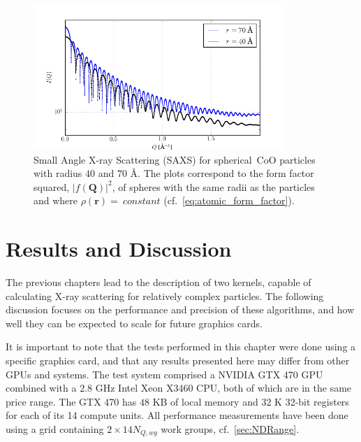 \documentclass[11pt,twoside]{report}
\newcommand{\chem}[1]{\ensuremath{\mathrm{#1}}}
\begin{document}
\begin{figure}[htbp]
	\begin{center}
		\includegraphics[width=0.85\textwidth]{img/diffractogram_random2.png}	
	\end{center}
	\caption{Small Angle X-ray Scattering (SAXS) for spherical~\chem{CoO} particles with radius $40$ and $70$ \AA. The plots correspond to the form factor squared, $|f({\mathbf Q})|^{2}$, of spheres  with the same radii as the particles and where $\rho(\mathbf{r}) =~constant$  (cf.~\cref{eq:atomic_form_factor}).\label{fig:diffractogram_random2}}
\end{figure}

\chapter{Results and Discussion\label{sec:results_discussion}}
The previous chapters lead to the description of two kernels, capable of calculating X-ray scattering for relatively complex particles. The following discussion focuses on the performance and precision of these algorithms, and how well they can be expected to scale for future graphics cards. 

\indent It is important to note that the tests performed in this chapter were done using a specific graphics card, and that any results presented here may differ from other GPUs and systems. The test system comprised a NVIDIA GTX 470 GPU combined with a $2.8$ GHz Intel Xeon X3460 CPU, both of which are in the same price range. The GTX 470 has $48$ KB of local memory and $32$ K 32-bit registers for each of its 14 compute units. All performance measurements have been done using a grid containing $2\times14N_{Q,wg}$ work groups, cf.~\cref{sec:NDRange}.
\end{document}
